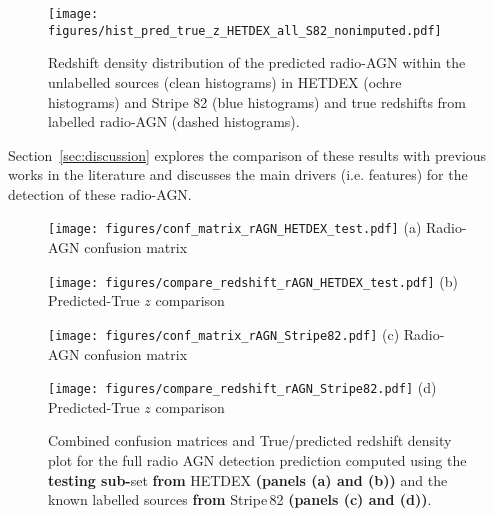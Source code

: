 \documentclass{aa}
\begin{document}
\begin{figure}
  \centering
    \texttt{[image: figures/hist\_pred\_true\_z\_HETDEX\_all\_S82\_nonimputed.pdf]}
  \caption{Redshift density distribution of the predicted radio-AGN within the unlabelled sources (clean histograms) in HETDEX (ochre histograms) and Stripe 82 (blue histograms) and true redshifts from labelled radio-AGN (dashed histograms).}
  \label{fig:hist_pred_z_unlabel_true_z_label}
\end{figure}

Section~\ref{sec:discussion} explores the comparison of these results with previous works in the literature and discusses the main drivers (i.e. features) for the detection of these radio-AGN.

\begin{figure*}
  \centering
  \begin{minipage}{0.20\textwidth}
    \centering
    \texttt{[image: figures/conf\_matrix\_rAGN\_HETDEX\_test.pdf]}\hfill\break
    {(a) Radio-AGN confusion matrix}
  \end{minipage}%
      \centering
  \begin{minipage}{0.30\textwidth}
    \centering
    \texttt{[image: figures/compare\_redshift\_rAGN\_HETDEX\_test.pdf]}\hfill\break
    {(b) Predicted-True $z$ comparison}
  \end{minipage}%
  \begin{minipage}{0.20\textwidth}
    \centering
    \texttt{[image: figures/conf\_matrix\_rAGN\_Stripe82.pdf]}\hfill\break
    {(c) Radio-AGN confusion matrix}
  \end{minipage}%
  \begin{minipage}{0.30\textwidth}
    \centering
    \texttt{[image: figures/compare\_redshift\_rAGN\_Stripe82.pdf]}\hfill\break
    {(d) Predicted-True $z$ comparison}
  \end{minipage}%
  \caption{Combined confusion matrices and True/predicted redshift density plot for the full radio AGN detection prediction computed using the \textbf{testing sub-}set \textbf{from} HETDEX \textbf{(panels (a) and (b))} and the known labelled sources \textbf{from} Stripe\,82 \textbf{(panels (c) and (d))}.
  }
  \label{fig:conf_matx_results_radio_AGN}
\end{figure*}
\end{document}
